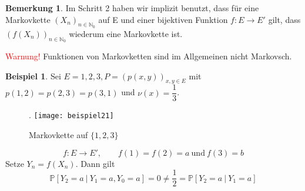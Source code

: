 \documentclass[a4paper,12pt]{scrartcl}
\theoremstyle{definition}
\newtheorem{bem}{Bemerkung}[section]
\newtheorem{bsp}{Beispiel}[section]
\begin{document}
\begin{bem}
Im Schritt 2 haben wir implizit benutzt, dass für eine Markovkette $(X_{n})_{n \in \mathbb{N}_{0}}$ auf E und einer bijektiven Funktion $f:E \to E'$ gilt, dass $ (f(X_{n}))_{n \in \mathbb{N}_{0}} $ wiederum eine Markovkette ist.
\end{bem}
\noindent
\textcolor{red}{Warnung!} Funktionen von Markovketten sind im Allgemeinen nicht Markovsch.
\begin{bsp}
Sei $E={1,2,3}, P = (p(x,y))_{x,y \in E}$ mit $p(1,2)=p(2,3)=p(3,1)$ und $\nu(x) = \dfrac{1}{3}$.
\end{bsp}
\begin{figure}[H].
\centering
\texttt{[image: beispiel21]}
\caption{Markovkette auf ${\lbrace 1,2,3 \rbrace}$}
\end{figure}
\noindent
\begin{equation*}
f: E \to E', \qquad f(1) = f(2) = a \: \mathrm{und} \: f(3) = b
\end{equation*}
Setze $Y_{n}=f(X_{n})$. Dann gilt
\begin{equation*}
\mathbb{P}[Y_{2} = a \: | \: Y_{1} = a, Y_{0} = a] = 0 \neq \dfrac{1}{2} = \mathbb{P}[Y_{2} = a \: | \: Y_{1} = a]
\end{equation*}
\end{document}
